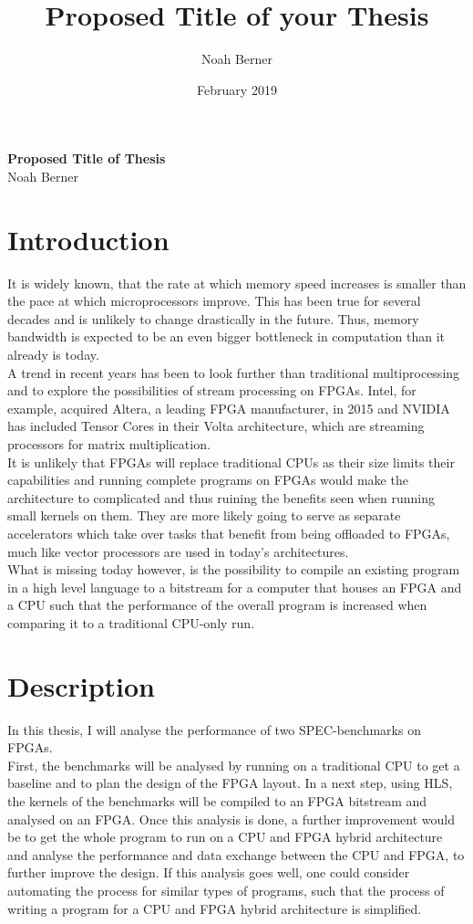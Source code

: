 \documentclass[12pt]{article}
\title{Proposed Title of your Thesis}
\author{Noah Berner}
\date{February 2019}
\begin{document}
\begingroup  
  \centering
  \LARGE \textbf{Proposed Title of Thesis}\\
  \large Noah Berner\par
\endgroup

\section*{Introduction}
It is widely known, that the rate at which memory speed increases is smaller than the pace at which microprocessors improve. This has been true for several decades and is unlikely to change drastically in the future. Thus, memory bandwidth is expected to be an even bigger bottleneck in computation than it already is today.\\
A trend in recent years has been to look further than traditional multiprocessing and to explore the possibilities of stream processing on FPGAs. Intel, for example, acquired Altera, a leading FPGA manufacturer, in 2015 and NVIDIA has included Tensor Cores in their Volta architecture, which are streaming processors for matrix multiplication.\\
It is unlikely that FPGAs will replace traditional CPUs as their size limits their capabilities and running complete programs on FPGAs would make the architecture to complicated and thus ruining the benefits seen when running small kernels on them. They are more likely going to serve as separate accelerators which take over tasks that benefit from being offloaded to FPGAs, much like vector processors are used in today's architectures.\\
What is missing today however, is the possibility to compile an existing program in a high level language to a bitstream for a computer that houses an FPGA and a CPU such that the performance of the overall program is increased when comparing it to a traditional CPU-only run.
\section*{Description}
In this thesis, I will analyse the performance of two SPEC-benchmarks on FPGAs.\\
First, the benchmarks will be analysed by running on a traditional CPU to get a baseline and to plan the design of the FPGA layout. In a next step, using HLS, the kernels of the benchmarks will be compiled to an FPGA bitstream and analysed on an FPGA. Once this analysis is done, a further improvement would be to get the whole program to run on a CPU and FPGA hybrid architecture and analyse the performance and data exchange between the CPU and FPGA, to further improve the design. If this analysis goes well, one could consider automating the process for similar types of programs, such that the process of writing a program for a CPU and FPGA hybrid architecture is simplified.
\end{document}
